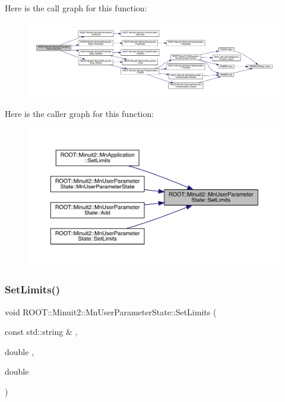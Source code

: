 Here is the call graph for this function\+:
\nopagebreak
\begin{figure}[H]
\begin{center}
\leavevmode
\includegraphics[width=350pt]{d3/de0/classROOT_1_1Minuit2_1_1MnUserParameterState_a0552162fb1f4fd9ae1be3ea7839fea5b_cgraph}
\end{center}
\end{figure}
Here is the caller graph for this function\+:
\nopagebreak
\begin{figure}[H]
\begin{center}
\leavevmode
\includegraphics[width=350pt]{d3/de0/classROOT_1_1Minuit2_1_1MnUserParameterState_a0552162fb1f4fd9ae1be3ea7839fea5b_icgraph}
\end{center}
\end{figure}
\mbox{\label{classROOT_1_1Minuit2_1_1MnUserParameterState_ab178dda717939b16da948c96d2180b89}} 
\subsubsection{\texorpdfstring{SetLimits()}{SetLimits()}\hspace{0.1cm}{\footnotesize\ttfamily [4/6]}}
{\footnotesize\ttfamily void R\+O\+O\+T\+::\+Minuit2\+::\+Mn\+User\+Parameter\+State\+::\+Set\+Limits (\begin{DoxyParamCaption}\item[{const std\+::string \&}]{,  }\item[{double}]{,  }\item[{double}]{ }\end{DoxyParamCaption})}

